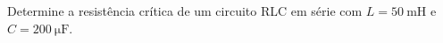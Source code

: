 \begin{questao}[1]{}
Determine a resistência crítica de um circuito RLC em série com $L=\SI{50}{\milli\henry}$ e
$C=\SI{200}{\micro\farad}$.
\end{questao}

\gabarito[Nível 1]
